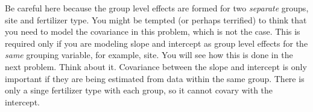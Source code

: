 \documentclass[12pt, oneside]{article}
\newif\ifanswers
\begin{document}
\begin{enumerate} [leftmargin=*]
Be careful here because the group level effects are formed for two \emph{separate} groups, site and fertilizer type.  You might be tempted (or perhaps terrified)  to think that you need to model the covariance in this problem, which is not the case.  This is required only if you are modeling slope and intercept as group level effects for the \emph{same} grouping variable, for example, site.  You will see how this is done in the next problem.  Think about it. Covariance between the slope and intercept is only important if they are being estimated from data within the same group. There is only a singe fertilizer type with each group, so it cannot covary with the intercept. 

\ifanswers
\newpage
\begin{center}
\texttt{[image: DAG4.png]}
\end{center}
\begin{align*}
g_{1}\big(\alpha_{j},\beta_{k},\log(x_{ijk})\big) &= \alpha_{j}+\beta_{k}\log(x_{ijk})\\
g_{2}\big(\kappa,\eta,\text{logit}(w_{j})\big) &= \kappa+\eta\text{logit}(w_{j})\\
\big[\bm{\alpha},\bm{\beta},\sigma,\varsigma_{\alpha},\kappa,\eta,\mu_{\beta,}\varsigma_{\beta}\mid\mathbf{y}\big] &\propto \prod_{j=1}^{J}\prod_{k=1}^{K_{j}}\prod_{i=1}^{n_{j}}\text{normal}\big(\log\big(y_{ijk}\big)\mid
g_{1}\big(\alpha_{j},\beta_{k},\log(x_{ijk})\big),\sigma^{2}\big)\\
 & \times \text{normal}\big(\alpha_{j}\mid g_{2}\big(\kappa,\eta,\text{logit}(w_{j})\big),\varsigma_{\alpha}^{2}\big)\\
 & \times \text{normal}\big(\beta_{k}\mid \mu_{\beta},\varsigma_{\beta}^{2}\big)\\
 & \times \text{normal}\big(\eta\mid 0,1000\big)\\
 & \times \text{normal}\big(\kappa\mid 0,1000\big)\\
 & \times \text{uniform}\big(\sigma\mid 0,100\big)\\
 & \times \text{uniform}\big(\varsigma_{\alpha}\mid 0,200\big)\\
 & \times \text{normal}\big(\mu_{\beta}\mid 0,1000\big)\\
 & \times \text{uniform}\big(\varsigma_{\beta}\mid 0,200\big)
\end{align*}
\fi

\newpage


\end{enumerate}
\end{document}
